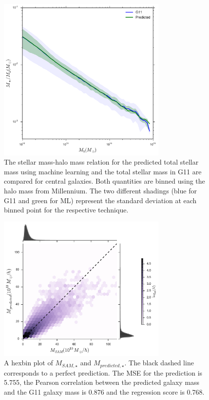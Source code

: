 \documentclass[a4paper,fleqn,usenatbib]{mnras}
\begin{document}
\begin{figure}
  \includegraphics[width=84mm]{fig1.pdf}
  \caption{The stellar mass-halo mass relation for the predicted total stellar mass using machine learning and the total stellar mass in G11 are compared for central galaxies. Both quantities are binned using the halo mass from Millennium. The two different shadings (blue for G11 and green for ML) represent the standard deviation at each binned point for the respective technique.}
   \label{fig:smhm}
\end{figure}


\begin{figure}
\includegraphics[width=84mm]{fig2.pdf}

\caption{A hexbin plot of $M_{SAM,\star}$ and $M_{predicted,\star}$. The black dashed line corresponds to a perfect prediction. The MSE for the prediction is 5.755, the Pearson correlation between the predicted galaxy mass and the G11 galaxy mass is 0.876 and the regression score is 0.768.}
\label{stellar1}
\end{figure}
\end{document}
